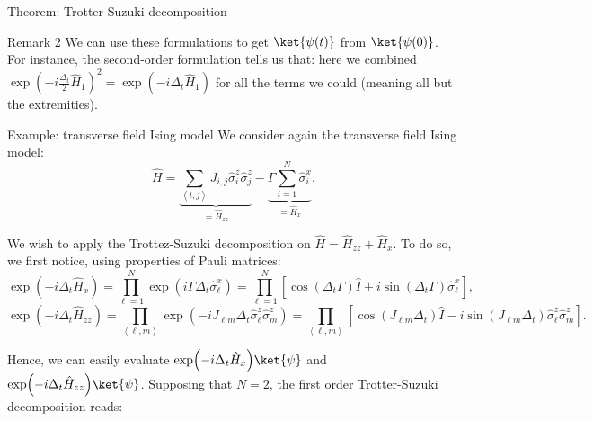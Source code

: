 \documentclass[a4paper]{article}
\begin{document}
\begin{parag}{Theorem: Trotter-Suzuki decomposition}
    \begin{subparag}{Remark 2}
        We can use these formulations to get $\ket{\psi\left(t\right)}$ from $\ket{\psi\left(0\right)}$. For instance, the second-order formulation tells us that:
        here we combined $\exp\left(-i \frac{\Delta_t}{2} \hat{H}_1\right)^2 = \exp\left(-i \Delta_t \hat{H}_1\right)$ for all the terms we could (meaning all but the extremities).
    \end{subparag}
\end{parag}

\begin{parag}{Example: transverse field Ising model}
    We consider again the transverse field Ising model: 
    \[\hat{H} = \underbrace{\sum_{\left\langle i, j \right\rangle} J_{i, j} \hat{\sigma}_i^z \hat{\sigma}_j^z}_{= \hat{H}_{zz}} - \underbrace{\Gamma \sum_{i=1}^{N} \hat{\sigma}_i^x}_{= \hat{H}_x}.\]

    We wish to apply the Trottez-Suzuki decomposition on $\hat{H} = \hat{H}_{zz} + \hat{H}_x$. To do so, we first notice, using properties of Pauli matrices: 
    \[\exp\left(-i \Delta_t \hat{H}_x\right) = \prod_{\ell=1}^{N} \exp\left(i \Gamma \Delta_t \hat{\sigma}_{\ell}^x\right) = \prod_{\ell=1}^{N} \left[\cos\left(\Delta_t \Gamma\right) \hat{I} + i \sin\left(\Delta_t \Gamma\right) \hat{\sigma}_{\ell}^x\right],\]
    \[\exp\left(-i \Delta_t \hat{H}_{zz}\right) = \prod_{\left\langle \ell, m \right\rangle} \exp\left(-i J_{\ell m} \Delta_t \hat{\sigma}_{\ell}^z \hat{\sigma}_m^z\right) = \prod_{\left\langle \ell, m \right\rangle} \left[\cos\left(J_{\ell m} \Delta_t\right) \hat{I} - i \sin\left(J_{\ell m} \Delta_t\right) \hat{\sigma}_{\ell}^z \hat{\sigma}_{m}^z\right].\]

    Hence, we can easily evaluate $\exp\left(-i \Delta_t \hat{H}_x\right) \ket{\psi}$ and $\exp\left(-i \Delta_t \hat{H}_{zz}\right) \ket{\psi}$. Supposing that $N = 2$, the first order Trotter-Suzuki decomposition reads: 
\end{parag}
\end{document}
